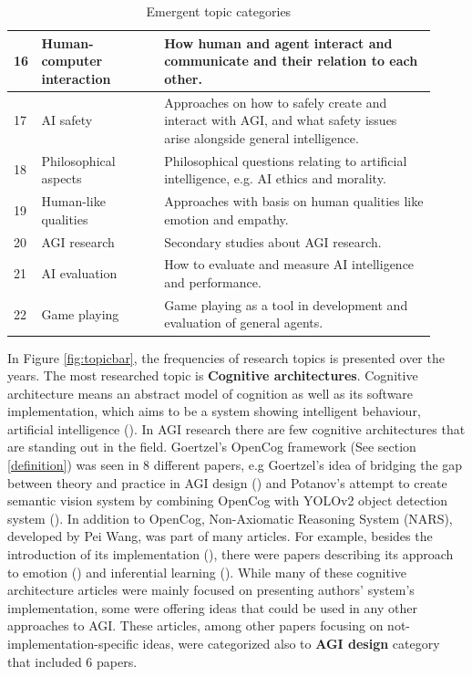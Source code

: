 \documentclass[utf8,english]{gradu3}
\begin{document}
\begin{table}[H]
\begin{tabular}{p{0.02\linewidth} p{0.28\linewidth} p{0.62\linewidth}}
    16 & Human-computer interaction & How human and agent interact and communicate and their relation to each other.\\ \hline
    17 & AI safety & Approaches on how to safely create and interact with AGI, and what safety issues arise alongside general intelligence.\\ \hline
    18 & Philosophical aspects & Philosophical questions relating to artificial intelligence, e.g. AI ethics and morality.\\ \hline
    19 & Human-like qualities & Approaches with basis on human qualities like emotion and empathy.\\ \hline
    20 & AGI research & Secondary studies about AGI research. \\ \hline
    21 & AI evaluation & How to evaluate and measure AI intelligence and performance.\\ \hline
    22 & Game playing  & Game playing as a tool in development and evaluation of general agents.\\ \hline

  \end{tabular}
  \caption{Emergent topic categories}
  \label{table:topicdescription}
\end{table}


In Figure \ref*{fig:topicbar}, the frequencies of research topics is presented
over the years. The most researched topic is \textbf{Cognitive architectures}.
Cognitive architecture means an abstract model of cognition as well as its
software implementation, which aims to be a system showing intelligent
behaviour, artificial intelligence (\cite{lieto2018}). In AGI research there are
few cognitive architectures that are standing out in the field. Goertzel's
OpenCog framework (See section \ref*{definition}) was seen in 8 different
papers, e.g Goertzel's idea of bridging the gap between theory and practice in
AGI design (\cite{goertzel2017agents}) and Potanov's attempt to create semantic
vision system by combining OpenCog with YOLOv2 object detection system
(\cite{potapov2018}). In addition to OpenCog, Non-Axiomatic Reasoning System
(NARS), developed by Pei Wang, was part of many articles. For example, besides
the introduction of its implementation (\cite{hammer2016opennars}), there were
papers describing its approach to emotion (\cite{wang2016emotional}) and
inferential learning (\cite{wang2016learning}). While many of these cognitive
architecture articles were mainly focused on presenting authors' system's
implementation, some were offering ideas that could be used in any other
approaches to AGI. These articles, among other papers focusing on
not-implementation-specific ideas, were categorized also to \textbf{AGI design}
category that included 6 papers.
\end{document}
